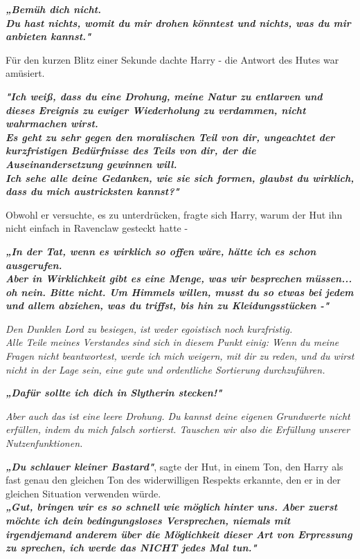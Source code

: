 {\textbf{\emph{„Bemüh dich nicht.\\ Du hast nichts, womit du mir drohen könntest und nichts, was du mir anbieten kannst."}}

Für den kurzen Blitz einer Sekunde dachte Harry - die Antwort des Hutes war amüsiert.

\textbf{\emph{"Ich weiß, dass du eine Drohung, meine Natur zu entlarven und dieses Ereignis zu ewiger Wiederholung zu verdammen, nicht wahrmachen wirst.\\ Es geht zu sehr gegen den moralischen Teil von dir, ungeachtet der kurzfristigen Bedürfnisse des Teils von dir, der die Auseinandersetzung gewinnen will.\\ Ich sehe alle deine Gedanken, wie sie sich formen, glaubst du wirklich, dass du mich austricksten kannst?"}}

Obwohl er versuchte, es zu unterdrücken, fragte sich Harry, warum der Hut ihn nicht einfach in Ravenclaw gesteckt hatte -

\textbf{\emph{„In der Tat, wenn es wirklich so offen wäre, hätte ich es schon ausgerufen.\\ Aber in Wirklichkeit gibt es eine Menge, was wir besprechen müssen... oh nein. Bitte nicht. Um Himmels willen, musst du so etwas bei jedem und allem abziehen, was du triffst, bis hin zu Kleidungsstücken -"}}

\emph{Den Dunklen Lord zu besiegen, ist weder egoistisch noch kurzfristig.\\ Alle Teile meines Verstandes sind sich in diesem Punkt einig: Wenn du meine Fragen nicht beantwortest, werde ich mich weigern, mit dir zu reden, und du wirst nicht in der Lage sein, eine gute und ordentliche Sortierung durchzuführen.}

\textbf{\emph{„Dafür sollte ich dich in Slytherin stecken!"}}

\emph{Aber auch das ist eine leere Drohung. Du kannst deine eigenen Grundwerte nicht erfüllen, indem du mich falsch sortierst. Tauschen wir also die Erfüllung unserer Nutzenfunktionen.}

\textbf{\emph{„Du schlauer kleiner Bastard"}}, sagte der Hut, in einem Ton, den Harry als fast genau den gleichen Ton des widerwilligen Respekts erkannte, den er in der gleichen Situation verwenden würde.\\ \textbf{\emph{\hfill\break „Gut, bringen wir es so schnell wie möglich hinter uns. Aber zuerst möchte ich dein bedingungsloses Versprechen, niemals mit irgendjemand anderem über die Möglichkeit dieser Art von Erpressung zu sprechen, ich werde das NICHT jedes Mal tun."}}

}
